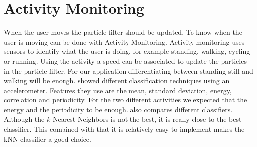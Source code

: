 \documentclass[journal]{IEEEtran}
\let\MYoriglatexcaption\caption
\renewcommand{\caption}[2][\relax]{\MYoriglatexcaption[#2]{#2}}
\begin{document}
%



\section{Activity Monitoring}

When the user moves the particle filter should be updated. To know when the
user is moving can be done with Activity Monitoring. Activity monitoring uses
sensors to identify what the user is doing, for example standing, walking,
cycling or running. Using the activity a speed can be associated to update the
particles in the particle filter. For our application differentiating between
standing still and walking will be enough. \cite{ravi2005activity} showed
different classification techniques using an accelerometer. Features they use
are the mean, standard deviation, energy, correlation and periodicity.  For the
two different activities we expected that the energy and the periodicity to
be enough. \cite{ravi2005activity} also compares different classifiers.
Although the $k$-Nearest-Neighbors is not the best, it is really close to the
best classifier. This combined with that it is relatively easy to implement
makes the kNN classifier a good choice.
\end{document}
